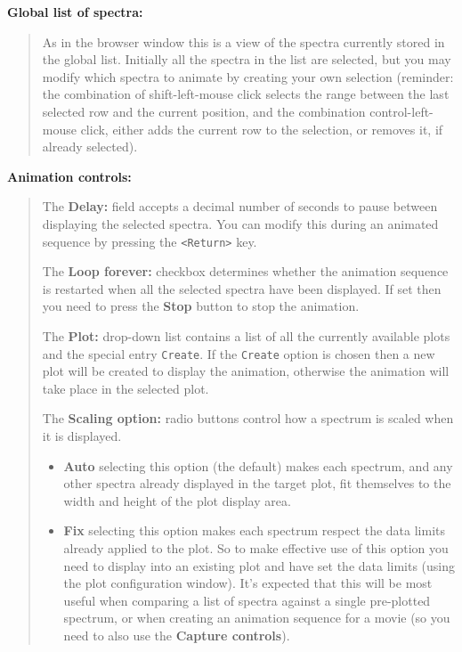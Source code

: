 \documentclass[twoside,11pt]{article}
\renewcommand{\_}{\texttt{\symbol{95}}}
\newcommand{\labelitem}[1]{\textbf{#1}}
\newcommand{\hitext}[1]{\texttt{#1}}
\newcommand{\subheading}[1]{\textbf{\large{#1}}}
\begin{document}
\subheading{Global list of spectra:}
\begin{quote}
 As in the browser window this is a view of the spectra currently
 stored in the global list. Initially all the spectra in the list are
 selected, but you may modify which spectra to animate by creating your
 own selection (reminder: the combination of shift-left-mouse click
 selects the range between the last selected row and the current
 position, and the combination control-left-mouse click, either adds
 the current row to the selection, or removes it, if already selected).
\end{quote}

\subheading{Animation controls:}
\begin{quote}
 The \labelitem{Delay:} field accepts a decimal number of seconds to
 pause between displaying the selected spectra. You can modify this
 during an animated sequence by pressing the \hitext{<Return>} key.

 The \labelitem{Loop forever:} checkbox determines whether the
 animation sequence is restarted when all the selected spectra have
 been displayed. If set then you need to press the \labelitem{Stop}
 button to stop the animation.

 The \labelitem{Plot:} drop-down list contains a list of all the
 currently available plots and the special entry \hitext{Create}. If
 the \hitext{Create} option is chosen then a new plot will be created
 to display the animation, otherwise the animation will take place in
 the selected plot.

 The \labelitem{Scaling option:} radio buttons control how a spectrum
 is scaled when it is displayed.

 \begin{itemize}
  \item \labelitem{Auto} selecting this option (the default) makes each
  spectrum, and any other spectra already displayed in the target plot,
  fit themselves to the width and height of the plot display area.

  \item \labelitem{Fix} selecting this option makes each spectrum respect
  the data limits already applied to the plot. So to make effective use
  of this option you need to display into an existing plot and have set
  the data limits (using the plot configuration window). It's expected
  that this will be most useful when comparing a list of spectra against
  a single pre-plotted spectrum, or when creating an animation sequence
  for a movie (so you need to also use the \labelitem{Capture controls}).


\end{itemize}
\end{quote}
\end{document}
